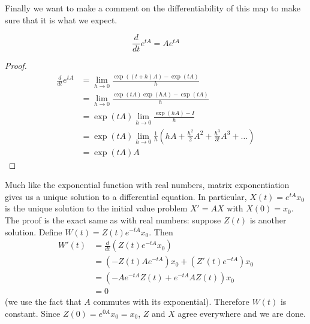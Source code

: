 Finally we want to make a comment on the differentiability of this map to make sure that it is what we expect.
\begin{lemma}
$$ \frac{d}{dt} e^{tA} = A e^{tA} $$
\end{lemma}
\begin{proof}
\begin{align*}
    \frac{d}{dt} e^{tA} &= \lim_{h \to 0} \frac{\exp((t + h)A) - \exp(tA)}{h}\\
    &= \lim_{h \to 0} \frac{\exp(tA)\exp(hA) - \exp(tA)}{h}\\
    &= \exp(tA) \lim_{h \to 0} \frac{\exp(hA) - I}{h}\\
    &= \exp(tA) \lim_{h \to 0} \frac{1}{h} \left( hA + \frac{h^2}{2} A^2 + \frac{h^3}{3!} A^3 + \dots \right)\\
    &= \exp(tA) A
\end{align*}
\end{proof}
Much like the exponential function with real numbers, matrix exponentiation gives us a unique solution to a differential equation. In particular, $X(t) = e^{tA} x_0$ is the unique solution to the initial value problem $X' = AX$ with $X(0) = x_0$. The proof is the exact same as with real numbers: suppose $Z(t)$ is another solution. Define $W(t) = Z(t) e^{-tA} x_0$. Then
\begin{align*}
    W'(t) &= \frac{d}{dt} (Z(t) e^{-tA} x_0)\\
    &= (-Z(t)A e^{-tA}) x_0 + (Z'(t) e^{-tA}) x_0\\
    &= (-A e^{-tA} Z(t) + e^{-tA} AZ(t))x_0\\
    &= 0
\end{align*}
(we use the fact that $A$ commutes with its exponential). Therefore $W(t)$ is constant. Since $Z(0) = e^{0A} x_0 = x_0$, $Z$ and $X$ agree everywhere and we are done.